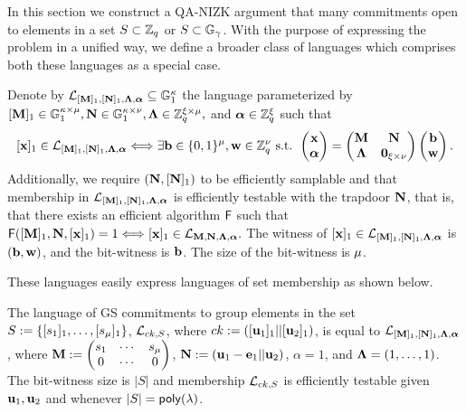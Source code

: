 
In this section we construct a QA-NIZK argument that many commitments open to elements in a set $S \subset \mathbb{Z}_q$ or  $S \subset \mathbb{G}_{\gamma}$. With the purpose of expressing the problem in a unified way, 
we define a broader class of languages which comprises both these languages as a special case. 


\begin{definition}
Denote by $\mathcal{L}_{[\mathbf{{M}}]_1,[\mathbf{{N}}]_1,\mathbf{{\Lambda}},{\boldsymbol \alpha}}\subseteq\mathbb{G}_1^{\kappa}$ the language parameterized by $[\mathbf{{M}}]_1 \in\mathbb{G}_1^{{\kappa}\times {\mu}},\mathbf{{N}}\in\mathbb{G}_1^{{\kappa}\times {\nu}},\mathbf{{\Lambda}}\in\mathbb{Z}_q^{{\xi}\times{\mu}},$ and ${\boldsymbol \alpha}\in\mathbb{Z}_q^{\xi}$ such that
\begin{equation}\label{eq:definition1}
[\mathbf{x}]_1\in\mathcal{L}_{[\mathbf{{M}}]_1,[\mathbf{{N}}]_1,\mathbf{{\Lambda}},{\boldsymbol \alpha}} \Longleftrightarrow \exists \mathbf{b}\in\{0,1\}^{\mu},\mathbf{w}\in\mathbb{Z}_q^{\nu} \text{ s.t. }
\left(\begin{matrix}
    \mathbf{x}\\
    {\boldsymbol \alpha}
\end{matrix}\right)
=
\begin{pmatrix}
    \mathbf{{M}}       & \mathbf{{N}}\\
    \mathbf{{\Lambda}} & \mathbf{{0}}_{{\xi}\times {\nu}}
\end{pmatrix}
\left(\begin{matrix}
    \mathbf{b}\\
    \mathbf{w}
\end{matrix}\right).
\end{equation}
Additionally, we require $(\mathbf{{N}},[\mathbf{{N}}]_1)$ to be efficiently samplable and that membership in $\mathcal{L}_{[\mathbf{{M}}]_1,[\mathbf{{N}}]_1,\mathbf{{\Lambda}},{\boldsymbol \alpha}}$ is efficiently testable with the trapdoor $\mathbf{{N}}$, that is, that there exists an efficient algorithm $\mathsf{F}$ such that $\mathsf{F}([\mathbf{{M}}]_1,\mathbf{{N}},[\mathbf{x}]_1)=1\Longleftrightarrow [\mathbf{x}]_1\in\mathcal{L}_{\mathbf{{M}},\mathbf{{N}},\mathbf{{\Lambda}},{\boldsymbol \alpha}}.$ The witness of 
$[\mathbf{x}]_1\in\mathcal{L}_{[\mathbf{{M}}]_1,[\mathbf{{N}}]_1,\mathbf{{\Lambda}},{\boldsymbol \alpha}}$ is $(\mathbf{b},\mathbf{w})$, and the bit-witness is $\mathbf{b}$. The size of the bit-witness is ${\mu}$. 
\end{definition}

These languages easily express languages of set membership as shown below.


\begin{example}
The language of GS commitments to group elements in the set $S:=\{[s_1]_1,\ldots,[s_{\mu}]_1\}$, $\mathcal{L}_{ck,S}$, where $ck:=([\mathbf{u}_1]_1||[\mathbf{u}_2]_1)$, is equal to $\mathcal{L}_{[\mathbf{{M}}]_1,[\mathbf{{N}}]_1,\mathbf{{\Lambda}},{\boldsymbol \alpha}}$, where
$\mathbf{{M}}:=\left(\begin{matrix}s_1 & \cdots & s_{\mu} \\ 0 &\cdots & 0\end{matrix}\right)$, $\mathbf{{N}}:=(\mathbf{u}_1-\mathbf{e}_1||\mathbf{u}_2)$, $\alpha=1$, and $\mathbf{{\Lambda}}=(1,\ldots,1)$. The bit-witness size is $|S|$ and membership $\mathcal{L}_{ck,S}$ is efficiently testable given $\mathbf{u}_1,\mathbf{u}_2$ and whenever $|S|=\mathsf{poly}(\lambda)$. 
\end{example}


